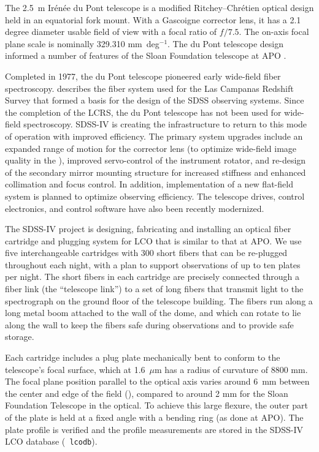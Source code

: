 The 2.5~m Ir\'{e}n\'{e}e du Pont telescope is a modified
Ritchey--Chr\'{e}tien optical design held in an equatorial fork mount.
With a Gascoigne corrector lens, it has a 2.1 degree diameter usable
field of view \citep{bowen73a} with a focal ratio of $f/7.5$. The
on-axis focal plane scale is nominally 329.310 mm~deg$^{-1}$. The du
Pont telescope design informed a number of features of the Sloan
Foundation telescope at APO \citep{gunn06a}.

Completed in 1977, the du Pont telescope pioneered early wide-field
fiber spectroscopy. \cite{shectman93a} describes the fiber system used
for the Las Campanas Redshift Survey \citep[LCRS,][]{shectman96a} that
formed a basis for the design of the SDSS observing systems. Since the
completion of the LCRS, the du Pont telescope has not been used for
wide-field spectroscopy.  SDSS-IV is creating the infrastructure to
return to this mode of operation with improved efficiency. The primary
system upgrades include an expanded range of motion for the corrector
lens (to optimize wide-field image quality in the \Hband), improved
servo-control of the instrument rotator, and re-design of the
secondary mirror mounting structure for increased stiffness and
enhanced collimation and focus control.  In addition, implementation
of a new flat-field system is planned to optimize observing
efficiency. The telescope drives, control electronics, and control
software have also been recently modernized.

The SDSS-IV project is designing, fabricating and installing an
optical fiber cartridge and plugging system for LCO that is similar to
that at APO. We use five interchangeable cartridges with 300 short
fibers that can be re-plugged throughout each night, with a plan to
support observations of up to ten plates per night. The short fibers
in each cartridge are precisely connected through a fiber link
(the ``telescope link'') to a set of long fibers that transmit light
to the spectrograph on the ground floor of the telescope building. The
fibers run along a long metal boom attached to the wall of the dome,
and which can rotate to lie along the wall to keep the fibers safe
during observations and to provide safe storage.

Each cartridge includes a plug plate mechanically bent to conform to
the telescope's focal surface, which at \mbox{1.6 $\mu$m} has a radius
of curvature of 8800 mm. The focal plane position parallel to the
optical axis varies around \mbox{6 mm} between the center and edge of
the field (\citealt{shectman93a}), compared to around 2 mm for the
Sloan Foundation Telescope in the optical.  To achieve this large
flexure, the outer part of the plate is held at a fixed angle with a
bending ring (as done at APO). The plate profile is verified and the
profile measurements are stored in the SDSS-IV LCO database ({\tt
lcodb}).

